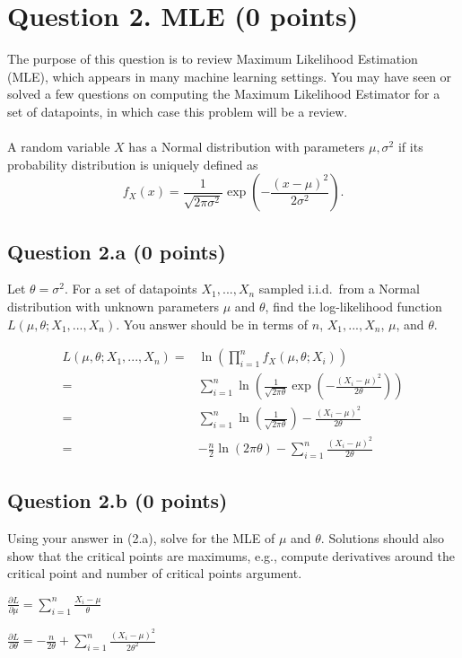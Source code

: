\documentclass[12pt]{article}
\newcommand\iid{i.i.d.}
\begin{document}
\section*{Question 2. MLE (0 points)}
The purpose of this question is to review Maximum Likelihood Estimation (MLE), which appears in many machine learning settings. You may have seen or solved a few questions on computing the Maximum Likelihood Estimator for a set of datapoints, in which case this problem will be a review.
\\\\
A random variable $X$ has a Normal distribution with parameters $\mu,\sigma^2$ if its probability distribution is uniquely defined as
$$ f_X(x) = \frac{1}{\sqrt{2\pi \sigma^2}} \exp \left( - \frac{(x - \mu)^2}{2\sigma^2} \right).  $$

\subsection*{Question 2.a (0 points)} 
Let $\theta = \sigma^2$. For a set of datapoints $X_1,...,X_n$ sampled \iid~from a Normal distribution with unknown parameters $\mu$ and $\theta$, find the log-likelihood function $L(\mu, \theta; X_1,...,X_n)$. You answer should be in terms of $n$, $X_1,...,X_n$, $\mu$, and $\theta$.

\begin{solution}
\begin{align}
    L(\mu, \theta; X_1,...,X_n) = & \ln \left(\prod_{i=1}^{n}f_X(\mu, \theta; X_i)\right) \\
    = & \sum_{i=1}^{n}\ln \left( \frac{1}{\sqrt{2\pi \theta}} \exp \left( - \frac{(X_i - \mu)^2}{2\theta} \right) \right) \\
    = & \sum_{i=1}^{n}\ln \left( \frac{1}{\sqrt{2\pi \theta}} \right) - \frac{(X_i - \mu)^2}{2\theta} \\
    = & -\frac{n}{2} \ln \left( 2 \pi \theta \right) - \sum_{i=1}^{n} \frac{(X_i - \mu)^2}{2\theta}
\end{align}

\end{solution}
\subsection*{Question 2.b (0 points)} 
Using your answer in (2.a), solve for the MLE of $\mu$ and $\theta$. Solutions should also show that the critical points are maximums, e.g., compute derivatives around the critical point and number of critical points argument.
\begin{solution}
$\frac{\partial L}{\partial \mu}=\sum_{i=1}^{n} \frac{X_i - \mu}{\theta}$

$\frac{\partial L}{\partial \theta}= -\frac{n}{2\theta} + \sum_{i=1}^{n} \frac{(X_i - \mu)^2}{2\theta^2}$
\end{solution}
\newpage
\end{document}
